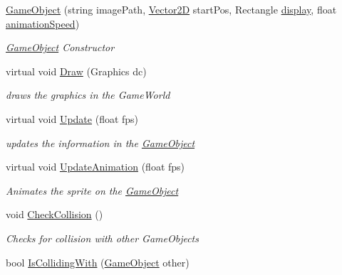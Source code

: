 \begin{DoxyCompactItemize}
\item 
\hyperlink{class_mage_twinstick_1_1_game_object_a70fd6f506e37d368c4b5dc324286e0ec}{Game\+Object} (string image\+Path, \hyperlink{class_mage_twinstick_1_1_vector2_d}{Vector2\+D} start\+Pos, Rectangle \hyperlink{class_mage_twinstick_1_1_game_object_a5807df7f837dc87c8955a008d0b27b50}{display}, float \hyperlink{class_mage_twinstick_1_1_game_object_a5d21c31402c27c5a19f2a62d98720456}{animation\+Speed})
\begin{DoxyCompactList}\small\item\em \hyperlink{class_mage_twinstick_1_1_game_object}{Game\+Object} Constructor \end{DoxyCompactList}\item 
virtual void \hyperlink{class_mage_twinstick_1_1_game_object_a11628f4d9b508e2d976ca25f716b74f5}{Draw} (Graphics dc)
\begin{DoxyCompactList}\small\item\em draws the graphics in the Game\+World \end{DoxyCompactList}\item 
virtual void \hyperlink{class_mage_twinstick_1_1_game_object_a3de8248d06d234f8335525bbb28ccacc}{Update} (float fps)
\begin{DoxyCompactList}\small\item\em updates the information in the \hyperlink{class_mage_twinstick_1_1_game_object}{Game\+Object} \end{DoxyCompactList}\item 
virtual void \hyperlink{class_mage_twinstick_1_1_game_object_a35d6d9af3335b978c618ab73da1215a0}{Update\+Animation} (float fps)
\begin{DoxyCompactList}\small\item\em Animates the sprite on the \hyperlink{class_mage_twinstick_1_1_game_object}{Game\+Object} \end{DoxyCompactList}\item 
void \hyperlink{class_mage_twinstick_1_1_game_object_a5ed64726e236792a162c2899b7446d66}{Check\+Collision} ()
\begin{DoxyCompactList}\small\item\em Checks for collision with other Game\+Objects \end{DoxyCompactList}\item 
bool \hyperlink{class_mage_twinstick_1_1_game_object_a024097f67b0a8b2f38451e8df05b6b1d}{Is\+Colliding\+With} (\hyperlink{class_mage_twinstick_1_1_game_object}{Game\+Object} other)

\end{DoxyCompactItemize}
